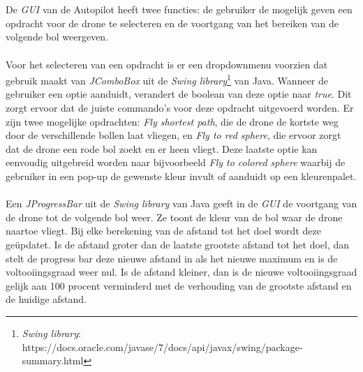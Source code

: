 \\
\\
De \textit{GUI} van de Autopilot heeft twee functies: de gebruiker de mogelijk geven een opdracht voor de drone te selecteren en de voortgang van het bereiken van de volgende bol weergeven.
\\
\\
Voor het selecteren van een opdracht is er een dropdownmenu voorzien dat gebruik maakt van \textit{JComboBox} uit de \textit{Swing library}\footnote{\textit{Swing library}: https://docs.oracle.com/javase/7/docs/api/javax/swing/package-summary.html} van Java. Wanneer de gebruiker een optie aanduidt, verandert de boolean van deze optie naar \textit{true}. Dit zorgt ervoor dat de juiste commando's voor deze opdracht uitgevoerd worden. Er zijn twee mogelijke opdrachten: \textit{Fly shortest path}, die de drone de kortste weg door de verschillende bollen laat vliegen, en \textit{Fly to red sphere}, die ervoor zorgt dat de drone een rode bol zoekt en er heen vliegt. Deze laatste optie kan eenvoudig uitgebreid worden naar bijvoorbeeld \textit{Fly to colored sphere} waarbij de gebruiker in een pop-up de gewenste kleur invult of aanduidt op een kleurenpalet. 
\\
\\
Een \textit{JProgressBar} uit de \textit{Swing library} van Java geeft in de \textit{GUI} de voortgang van de drone tot de volgende bol weer. Ze toont de kleur van de bol waar de drone naartoe vliegt. Bij elke berekening van de afstand tot het doel wordt deze ge\"{u}pdatet. Is de afstand groter dan de laatste grootste afstand tot het doel, dan stelt de progress bar deze nieuwe afstand in als het nieuwe maximum en is de voltooiingsgraad weer nul. Is de afstand kleiner, dan is de nieuwe voltooiingsgraad gelijk aan 100 procent verminderd met de verhouding van de grootste afstand en de huidige afstand.  
